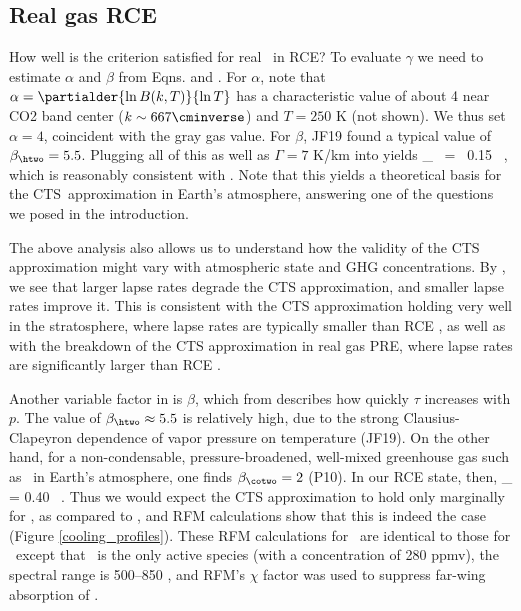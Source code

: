 \documentclass[10pt]{article}
\newcommand{\CTS}{\ensuremath{\mathrm{CTS}}}
\begin{document}
\subsection{Real gas RCE}
How well is the criterion  satisfied for real  \htwo\ in RCE? To evaluate $\gamma$ we need to estimate $\alpha$ and $\beta$ from Eqns.  and . For $\alpha$, note that $\alpha = \partialder{ \ln B(k,T)}{\ln T}$ has a characteristic value of about 4 near CO2 band center ($k\sim 667 \cminverse$) and $T=250$ K (not shown). We thus set $\alpha=4$, coincident with the gray gas value. For $\beta$, JF19 found a typical value of $\beta_{\htwo} = 5.5$. Plugging all of this as well as $\Gamma=7$ K/km into  yields
	\beqn
		\gamma_{\htwo}   \ = \ 0.15  \ ,
		\label{gamma_h2o}
		\n
	\eeqn
which is reasonably consistent with . Note that this yields a theoretical basis for the \CTS\ approximation in Earth's atmosphere, answering one of the questions we posed in the introduction.

The above analysis also allows us to understand how the validity of the CTS approximation might vary with atmospheric state and GHG concentrations. By , we see that larger lapse rates degrade the CTS approximation, and smaller lapse rates  improve it. This is consistent with the CTS approximation holding very well in the stratosphere, where lapse rates are typically smaller than RCE \citep[e.g.][as well as Fig. \ref{cts_h2o}]{rodgers1966}, as well as with the breakdown of the CTS approximation in real gas PRE, where lapse rates are significantly larger than RCE \citep[e.g.][P10]{manabe1964}. 

Another variable factor in  is $\beta$, which from  describes how quickly $\tau$ increases with $p$. The value of $\beta_{\htwo}\approx 5.5$ is relatively high, due to the strong Clausius-Clapeyron dependence of vapor pressure on temperature (JF19). On the other hand, for a non-condensable, pressure-broadened, well-mixed greenhouse gas such as \cotwo\ in Earth's atmosphere, one finds $\beta_{\cotwo} = 2$ (P10). In our RCE state, then, 
\beqn
	 \gamma_{\cotwo}  =  0.40  \ .
	 \n
 \eeqn
Thus we would expect the CTS approximation to hold only marginally for \cotwo, as compared to \htwo, and RFM calculations show that this is indeed the case (Figure \ref{cooling_profiles}). These RFM calculations for \cotwo\ are identical to those for \htwo\ except that \cotwo\ is the only active species (with a concentration of 280 ppmv), the spectral range is 500--850 \cminverse, and  RFM's $\chi$ factor was used to suppress far-wing absorption of \cotwo.  
\end{document}

